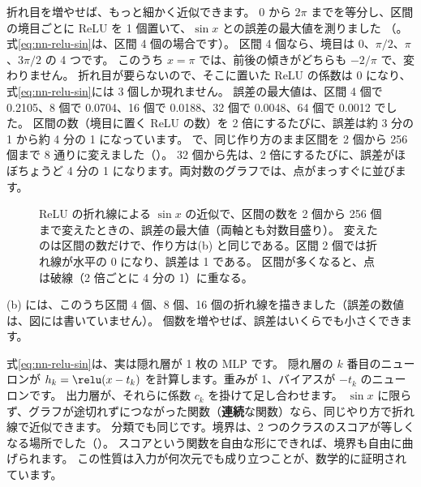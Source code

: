折れ目を増やせば、もっと細かく近似できます。
$0$ から $2\pi$ までを等分し、区間の境目ごとに ReLU を 1 個置いて、$\sin x$ との誤差の最大値を測りました
（。式\eqref{eq:nn-relu-sin}は、区間 4 個の場合です）。
区間 4 個なら、境目は $0$、$\pi/2$、$\pi$、$3\pi/2$ の 4 つです。
このうち $x=\pi$ では、前後の傾きがどちらも $-2/\pi$ で、変わりません。
折れ目が要らないので、そこに置いた ReLU の係数は 0 になり、式\eqref{eq:nn-relu-sin}には 3 個しか現れません。
誤差の最大値は、区間 4 個で 0.2105、8 個で 0.0704、16 個で 0.0188、32 個で 0.0048、64 個で 0.0012 でした。
区間の数（境目に置く ReLU の数）を 2 倍にするたびに、誤差は約 3 分の 1 から約 4 分の 1 になっています。
 で、同じ作り方のまま区間を 2 個から 256 個まで 8 通りに変えました（）。
32 個から先は、2 倍にするたびに、誤差がほぼちょうど 4 分の 1 になります。両対数のグラフでは、点がまっすぐに並びます。

\begin{figure}[tbp]
\centering
{}
\caption{ReLU の折れ線による $\sin x$ の近似で、区間の数を 2 個から 256 個まで変えたときの、誤差の最大値（両軸とも対数目盛り）。
変えたのは区間の数だけで、作り方は(b) と同じである。区間 2 個では折れ線が水平の 0 になり、誤差は 1 である。
区間が多くなると、点は破線（2 倍ごとに 4 分の 1）に重なる。}
\label{fig:nn-relu-err}
\end{figure}
(b) には、このうち区間 4 個、8 個、16 個の折れ線を描きました（誤差の数値は、図には書いていません）。
個数を増やせば、誤差はいくらでも小さくできます。

式\eqref{eq:nn-relu-sin}は、実は隠れ層が 1 枚の MLP です。
隠れ層の $k$ 番目のニューロンが $h_k=\relu(x-t_k)$ を計算します。重みが 1、バイアスが $-t_k$ のニューロンです。
出力層が、それらに係数 $c_k$ を掛けて足し合わせます。
$\sin x$ に限らず、グラフが途切れずにつながった関数（\textbf{連続}な関数）なら、同じやり方で折れ線で近似できます。
分類でも同じです。境界は、2 つのクラスのスコアが等しくなる場所でした（）。
スコアという関数を自由な形にできれば、境界も自由に曲げられます。
この性質は入力が何次元でも成り立つことが、数学的に証明されています。

